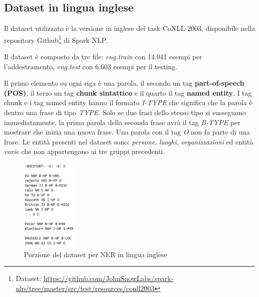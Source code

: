 \subsection{Dataset in lingua inglese} \label{ner_eng_data}
\label{sec:ner_dataset_en}
Il dataset utilizzato è la versione in inglese del task CoNLL-2003, disponibile nella repository Github\footnote{Dataset: \href{https://github.com/JohnSnowLabs/spark-nlp/tree/master/src/test/resources/conll2003}{https://github.com/JohnSnowLabs/spark-nlp/tree/master/src/test/resources/conll2003}} di Spark NLP. 

Il dataset è composto da tre file: \textit{eng.train} con 14.041 esempi per l’addestramento, \textit{eng.test} con 6.603 esempi per il testing.

Il primo elemento su ogni riga è una parola, il secondo un tag \textbf{part-of-speech (POS)}, il terzo un tag \textbf{chunk sintattico} e il quarto il tag \textbf{named entity}. I tag chunk e i tag named entity hanno il formato \textit{I-TYPE} che significa che la parola è dentro una frase di tipo \textit{TYPE}. Solo se due frasi dello stesso tipo si susseguono immediatamente, la prima parola della seconda frase avrà il tag \textit{B-TYPE} per mostrare che inizia una nuova frase. Una parola con il tag \textit{O} non fa parte di una frase. Le entità presenti nel dataset sono: \textit{persone}, \textit{luoghi}, \textit{organizzazioni} ed entità \textit{varie} che non appartengono ai tre gruppi precedenti.
\begin{figure}[hbt!]
    \centering
    \includegraphics[width=0.25\textwidth]{img/ner_en_dataset.png}
    \caption{Porzione del dataset per NER in lingua inglese}
    \label{fig:ner_en_dataset}
\end{figure}
